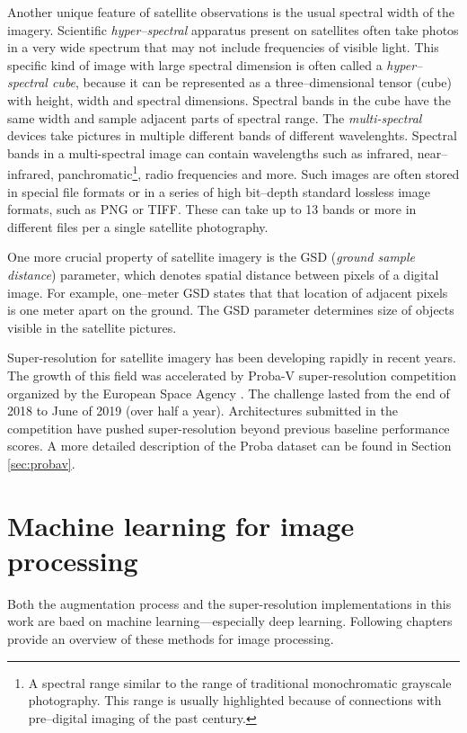 Another unique feature of satellite observations is the usual spectral width of the imagery.
Scientific \textit{hyper--spectral} apparatus present on satellites often take photos in a very wide spectrum that may not include frequencies of visible light.
This specific kind of image with large spectral dimension is often called a \textit{hyper--spectral cube}, because it can be represented as a three--dimensional tensor (cube) with height, width and spectral dimensions.
Spectral bands in the cube have the same width and sample adjacent parts of spectral range.
The \textit{multi-spectral} devices take pictures in multiple different bands of different wavelenghts.
Spectral bands in a multi-spectral image can contain wavelengths such as infrared, near--infrared, panchromatic\footnote{A spectral range similar to the range of traditional monochromatic grayscale photography. This range is usually highlighted because of connections with pre--digital imaging of the past century.}, radio frequencies and more.
Such images are often stored in special file formats or in a series of high bit--depth standard lossless image formats, such as PNG or TIFF.
These can take up to 13 bands  or more in different files per a single satellite photography.

One more crucial property of satellite imagery is the GSD (\textit{ground sample distance}) parameter, which denotes spatial distance between pixels of a digital image.
For example, one--meter GSD states that that location of adjacent pixels is one meter apart on the ground.
The GSD parameter determines size of objects visible in the satellite pictures.

Super-resolution for satellite imagery has been developing rapidly in recent years.
The growth of this field was accelerated by Proba-V super-resolution competition organized by the European Space Agency \cite{esa-proba-competition} .
The challenge lasted from the end of 2018 to June of 2019 (over half a year).
Architectures submitted in the competition have pushed super-resolution beyond previous baseline performance scores.
A more detailed description of the Proba dataset can be found in Section \ref{sec:probav}.

\section{Machine learning for image processing}
Both the augmentation process and the super-resolution implementations in this work are baed on machine learning---especially deep learning.
Following chapters provide an overview of these methods for image processing.

